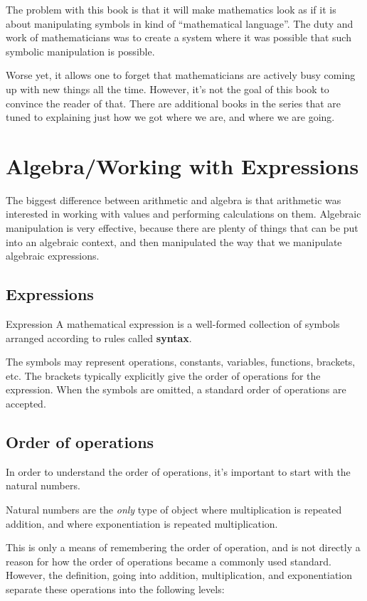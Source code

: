 \documentclass[11pt,twoside,letterpaper,fleqn,parskip=full]{book}
\begin{document}
The problem with this book is that it will make mathematics look as if it is about manipulating symbols in kind of ``mathematical language''. The duty and work of mathematicians was to create a system where it was possible that such symbolic manipulation is possible.

Worse yet, it allows one to forget that mathematicians are actively busy coming up with new things all the time. However, it's not the goal of this book to convince the reader of that. There are additional books in the series that are tuned to explaining just how we got where we are, and where we are going.

\chapter{Algebra/Working with Expressions}
The biggest difference between arithmetic and algebra is that arithmetic was interested in working with values and performing calculations on them. Algebraic manipulation is very effective, because there are plenty of things that can be put into an algebraic context, and then manipulated the way that we manipulate algebraic expressions.
\section{Expressions}
\begin{definition}{Expression}
A mathematical expression is a well-formed collection of symbols arranged according to rules called \textbf{syntax}.
\end{definition}

The symbols may represent operations, constants, variables, functions, brackets, etc. The brackets typically explicitly give the order of operations for the expression. When the symbols are omitted, a standard order of operations are accepted.

\section{Order of operations}
In order to understand the order of operations, it's important to start with the natural numbers.

\begin{remark}
    Natural numbers are the \emph{only} type of object where multiplication is repeated addition, and where exponentiation is repeated multiplication.
\end{remark}

This is only a means of remembering the order of operation, and is not directly a reason for how the order of operations became a commonly used standard. However, the definition, going into addition, multiplication, and exponentiation separate these operations into the following levels:
\end{document}
